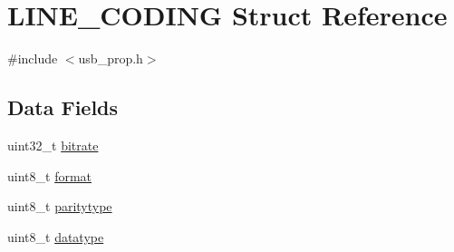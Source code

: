 \hypertarget{structLINE__CODING}{\section{L\+I\+N\+E\+\_\+\+C\+O\+D\+I\+N\+G Struct Reference}
\label{structLINE__CODING}
}


{\ttfamily \#include $<$usb\+\_\+prop.\+h$>$}

\subsection*{Data Fields}
\begin{DoxyCompactItemize}
\item 
uint32\+\_\+t \hyperlink{structLINE__CODING_a2e1429240f2631af0a2be3c2b5a1ef33}{bitrate}
\item 
uint8\+\_\+t \hyperlink{structLINE__CODING_a84359fc6fe07038511cab5d987ce88a3}{format}
\item 
uint8\+\_\+t \hyperlink{structLINE__CODING_af9d1a3bc78890998d5c5892c6444a39e}{paritytype}
\item 
uint8\+\_\+t \hyperlink{structLINE__CODING_a4e60e8f03ca205d2bae060c5ad551be3}{datatype}
\end{DoxyCompactItemize}


